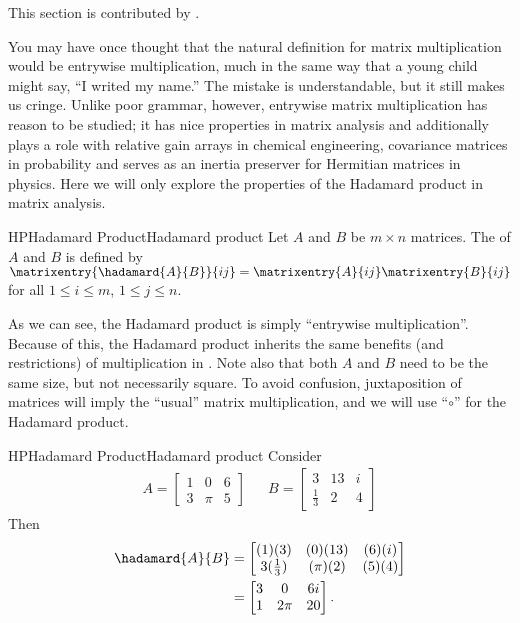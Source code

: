 %
%
This section is contributed by \elizabethmillion.\par
%
You may have once thought that the natural definition for matrix multiplication would be entrywise multiplication, much in the same way that a young child might say, ``I writed my name.'' The mistake is understandable, but it still makes us cringe. Unlike poor grammar, however, entrywise matrix multiplication has reason to be studied; it has nice properties in matrix analysis and additionally plays a role with relative gain arrays in chemical engineering, covariance matrices in probability and serves as an inertia preserver for Hermitian matrices in physics. Here we will only explore the properties of the Hadamard product in matrix analysis.
%
\begin{definition}{HP}{Hadamard Product}{Hadamard product} 
Let $A$ and $B$ be $m \times n$ matrices. The  of $A$ and $B$ is defined by $\matrixentry{\hadamard{A}{B}}{ij} = \matrixentry{A}{ij} \matrixentry{B}{ij}$ for all $1 \leq i \leq m$, $1 \leq j \leq n$.
%
\end{definition}
%
As we can see, the Hadamard product is simply ``entrywise multiplication''. Because of this, the Hadamard product inherits the same benefits (and restrictions) of multiplication in \complexes. Note also that both $A$ and $B$ need to be the same size, but not necessarily square. To avoid confusion, juxtaposition of matrices will imply the ``usual'' matrix multiplication, and we will use ``$\circ$'' for the Hadamard product. 
%
\begin{example}{HP}{Hadamard Product}{Hadamard product}
%
Consider
%
\begin{align*}
A=
\begin{bmatrix}
1 & 0 & 6 \\
3 & \pi & 5
\end{bmatrix}
&&
B=
\begin{bmatrix}
3 & 13 & i \\
\frac{1}{3} & 2 & 4
\end{bmatrix}
\end{align*}
%
Then
%
\begin{align*}
\hadamard{A}{B}
&=
\begin{bmatrix}
(1)(3) & (0)(13) & (6)(i) \\
3(\frac{1}{3}) & (\pi)(2) & (5)(4)
\end{bmatrix} \\
%
&=
\begin{bmatrix}
3 & 0 & 6 i \\
1 & 2 \pi & 20
\end{bmatrix}.
\end{align*}
%
\end{example}
